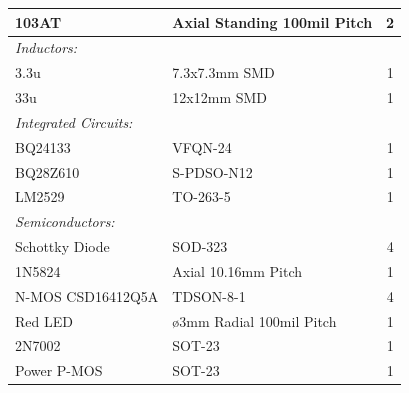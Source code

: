 \begin{tabular}{|l|l|c|}
	103AT & Axial Standing 100mil Pitch & 2 \\
	\hline 
	\emph{Inductors:} & & \\
	\hline
	3.3u & 7.3x7.3mm SMD & 1 \\
	\hline
	33u & 12x12mm SMD & 1 \\
	\hline
	\emph{Integrated Circuits:} & & \\
	\hline
	BQ24133 & VFQN-24 & 1 \\
	\hline
	BQ28Z610 & S-PDSO-N12 & 1 \\
	\hline
	LM2529 & TO-263-5 & 1 \\
	\hline
	\emph{Semiconductors:} & & \\
	\hline
	Schottky Diode & SOD-323 & 4 \\
	\hline
	1N5824 & Axial 10.16mm Pitch & 1 \\
	\hline
	N-MOS CSD16412Q5A & TDSON-8-1 & 4 \\
	\hline
	Red LED & ø3mm Radial 100mil Pitch & 1 \\
	\hline
	2N7002 & SOT-23 & 1 \\
	\hline
	Power P-MOS & SOT-23 & 1 \\
	\hline
\end{tabular}



